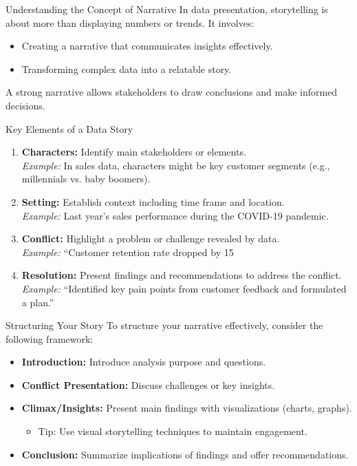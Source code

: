 \documentclass[aspectratio=169]{beamer}
\begin{document}
\begin{frame}[fragile]{Understanding the Concept of Narrative}
    In data presentation, storytelling is about more than displaying numbers or trends. It involves:
    \begin{itemize}
        \item Creating a narrative that communicates insights effectively.
        \item Transforming complex data into a relatable story.
    \end{itemize}
    A strong narrative allows stakeholders to draw conclusions and make informed decisions.
\end{frame}

\begin{frame}[fragile]{Key Elements of a Data Story}
    \begin{enumerate}
        \item \textbf{Characters:} Identify main stakeholders or elements.\\
            \textit{Example:} In sales data, characters might be key customer segments (e.g., millennials vs. baby boomers).
        \item \textbf{Setting:} Establish context including time frame and location.\\
            \textit{Example:} Last year’s sales performance during the COVID-19 pandemic.
        \item \textbf{Conflict:} Highlight a problem or challenge revealed by data.\\
            \textit{Example:} “Customer retention rate dropped by 15%
        \item \textbf{Resolution:} Present findings and recommendations to address the conflict.\\
            \textit{Example:} “Identified key pain points from customer feedback and formulated a plan.”
    \end{enumerate}
\end{frame}

\begin{frame}[fragile]{Structuring Your Story}
    To structure your narrative effectively, consider the following framework:
    \begin{itemize}
        \item \textbf{Introduction:} Introduce analysis purpose and questions.
        \item \textbf{Conflict Presentation:} Discuss challenges or key insights.
        \item \textbf{Climax/Insights:} Present main findings with visualizations (charts, graphs).
            \begin{itemize}
                \item Tip: Use visual storytelling techniques to maintain engagement.
            \end{itemize}
        \item \textbf{Conclusion:} Summarize implications of findings and offer recommendations.
    \end{itemize}
\end{frame}
\end{document}
